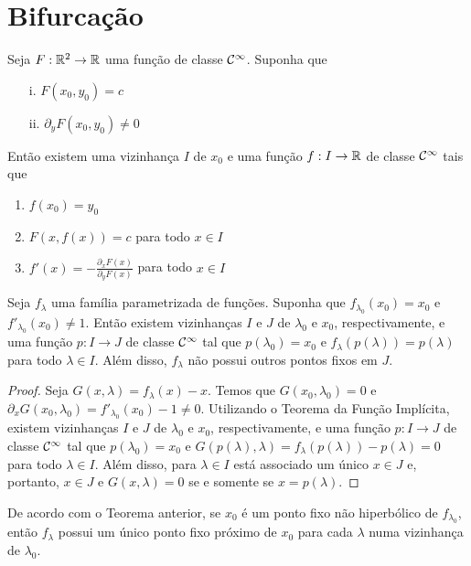 \section{Bifurcação}

\begin{theorem}
Seja $F: \mathbb{R}^2 \to \mathbb{R}$ uma função de classe $\mathcal{C}^\infty$. Suponha que
\begin{enumerate}
\item[i.] $F(x_0, y_0) = c$
\item[ii.] $\partial_y F(x_0, y_0) \neq 0$
\end{enumerate} 
Então existem uma vizinhança $I$ de $x_0$ e uma função $f: I \to \mathbb{R}$ de classe $\mathcal{C}^\infty$ tais que
\begin{enumerate}
\item $f(x_0) = y_0$
\item $F(x, f(x)) = c$ para todo $x \in I$
\item $f'(x) = -\frac{\partial_x F(x)}{\partial_y F(x)}$ para todo $x \in I$
\end{enumerate}
\end{theorem}

\begin{theorem}
\label{theorem1}
Seja $f_\lambda$ uma família parametrizada de funções. Suponha que $f_{\lambda_0}(x_0) = x_0$ e $f'_{\lambda_0}(x_0) \neq 1$. Então existem vizinhanças $I$ e $J$ de $\lambda_0$ e $x_0$, respectivamente, e uma função $p: I \to J$ de classe $\mathcal{C}^\infty$ tal que $p(\lambda_0) = x_0$ e $f_\lambda(p(\lambda)) = p(\lambda)$ para todo $\lambda \in I$. Além disso, $f_\lambda$ não possui outros pontos fixos em $J$.
\end{theorem}

\begin{proof}
Seja $G(x, \lambda) = f_\lambda(x) - x$. Temos que $G(x_0, \lambda_0) = 0$ e $\partial_x G(x_0, \lambda_0) = f'_{\lambda_0}(x_0) - 1 \neq 0$. Utilizando o Teorema da Função Implícita, existem vizinhanças $I$ e $J$ de $\lambda_0$ e $x_0$, respectivamente, e uma função $p: I \to J$ de classe $\mathcal{C}^\infty$ tal que $p(\lambda_0) = x_0$ e $G(p(\lambda), \lambda) = f_\lambda(p(\lambda)) - p(\lambda) = 0$ para todo $\lambda \in I$. Além disso, para $\lambda \in I$ está associado um único $x \in J$ e, portanto, $x \in J$ e $G(x, \lambda) = 0$ se e somente se $x = p(\lambda)$.
\end{proof}

De acordo com o Teorema anterior, se $x_0$ é um ponto fixo não hiperbólico de $f_{\lambda_0}$, então $f_\lambda$ possui um único ponto fixo próximo de $x_0$ para cada $\lambda$ numa vizinhança de $\lambda_0$.
 
